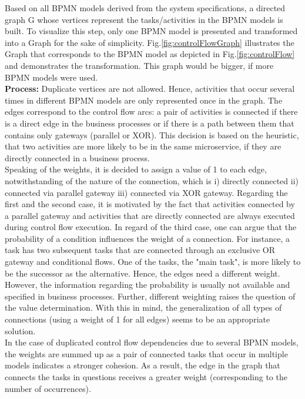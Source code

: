 \noindent
Based on all BPMN models derived from the system specifications, a directed graph G whose vertices represent the tasks/activities in the BPMN models is built. To visualize this step, only one BPMN model is presented and transformed into a Graph for the sake of simplicity. Fig.\ref{fig:controlFlowGraph} illustrates the Graph that corresponds to the BPMN model as depicted in Fig.\ref{fig:controlFlow} and demonstrates the transformation. This graph would be bigger, if more BPMN models were used.  \\

\noindent
\textbf{Process:} Duplicate vertices are not allowed. Hence, activities that occur several times in different BPMN models are only represented once in the graph.
The edges correspond to the control flow arcs: a pair of activities is connected if there is a direct edge in the business processes or if there is a path between them that contains only gateways (parallel or XOR). This decision is based on the heuristic, that two activities are more likely to be in the same microservice, if they are directly connected in a business process. \\
Speaking of the weights, it is decided to assign a value of 1 to each edge, notwithstanding of the nature of the connection, which is i) directly connected ii) connected via parallel gateway iii) connected via XOR gateway. Regarding the first and the second case, it is motivated by the fact that activities connected by a parallel gateway and activities that are directly connected are always executed during control flow execution.
In regard of the third case, one can argue that the probability of a condition influences the weight of a connection. For instance, a task has two subsequent tasks that are connected through an exclusive OR gateway and conditional flows. One of the tasks, the "main task", is more likely to be the successor as the alternative. Hence, the edges need a different weight. However, the information regarding the probability is usually not available and specified in business processes. Further, different weighting raises the question of the value determination. With this in mind, the generalization of all types of connections (using a weight of 1 for all edges) seems to be an appropriate solution. \\
In the case of duplicated control flow dependencies due to several BPMN models, the weights are summed up as a pair of connected tasks that occur in multiple models indicates a stronger cohesion. As a result, the edge in the graph that connects the tasks in questions receives a greater weight (corresponding to the number of occurrences).\\


